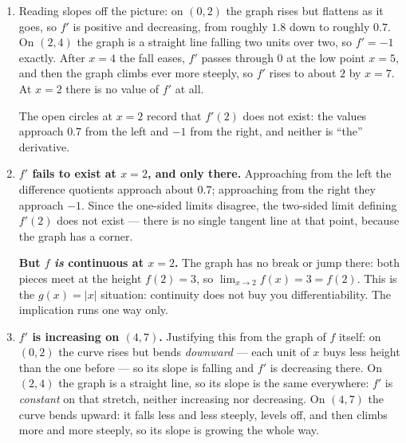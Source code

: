 \documentclass[11pt]{article}
\newcommand{\gridxy}[4]{%
  \foreach \gX in {#1,...,#2} \draw[gray!25] (\gX,#3) -- (\gX,#4);
  \foreach \gY in {#3,...,#4} \draw[gray!25] (#1,\gY) -- (#2,\gY);}
\begin{document}
\begin{enumerate}
\item Reading slopes off the picture: on $(0,2)$ the graph rises but flattens as it goes, so
$f'$ is positive and decreasing, from roughly $1.8$ down to roughly $0.7$. On $(2,4)$ the
graph is a straight line falling two units over two, so $f' = -1$ exactly. After $x=4$ the
fall eases, $f'$ passes through $0$ at the low point $x=5$, and then the graph climbs ever
more steeply, so $f'$ rises to about $2$ by $x=7$. At $x=2$ there is no value of $f'$ at all.

\smallskip
\begin{center}
\end{center}
The open circles at $x=2$ record that $f'(2)$ does not exist: the values approach $0.7$ from
the left and $-1$ from the right, and neither is ``the'' derivative.

\item \textbf{$f'$ fails to exist at $x=2$, and only there.} Approaching from the left the
difference quotients approach about $0.7$; approaching from the right they approach $-1$.
Since the one-sided limits disagree, the two-sided limit defining $f'(2)$ does not exist ---
there is no single tangent line at that point, because the graph has a corner.

\textbf{But $f$ \emph{is} continuous at $x=2$.} The graph has no break or jump there: both
pieces meet at the height $f(2)=3$, so $\lim_{x\to2}f(x) = 3 = f(2)$. This is the
$g(x)=|x|$ situation: continuity does not buy you differentiability. The implication runs
one way only.

\item \textbf{$f'$ is increasing on $(4,7)$.} Justifying this from the graph of $f$ itself:
on $(0,2)$ the curve rises but bends \emph{downward} --- each unit of $x$ buys less height
than the one before --- so its slope is falling and $f'$ is decreasing there. On $(2,4)$ the
graph is a straight line, so its slope is the same everywhere: $f'$ is \emph{constant} on
that stretch, neither increasing nor decreasing. On $(4,7)$ the curve bends upward: it falls
less and less steeply, levels off, and then climbs more and more steeply, so its slope is
growing the whole way.


\end{enumerate}
\end{document}
